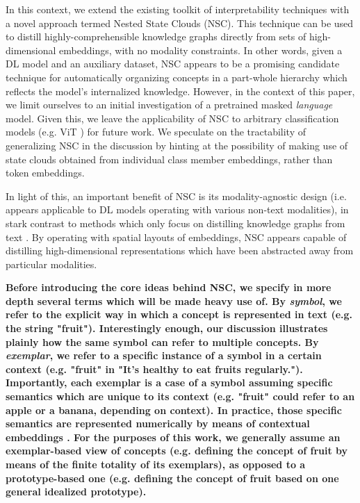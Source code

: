 In this context, we extend the existing toolkit of interpretability techniques with a novel approach termed Nested State Clouds (NSC). This technique can be used to distill highly-comprehensible knowledge graphs directly from sets of high-dimensional embeddings, with no modality constraints. In other words, given a DL model and an auxiliary dataset, NSC appears to be a promising candidate technique for automatically organizing concepts in a part-whole hierarchy which reflects the model's internalized knowledge. However, in the context of this paper, we limit ourselves to an initial investigation of a pretrained masked \textit{language} model. Given this, we leave the applicability of NSC to arbitrary classification models (e.g. ViT \citep{dosovitskiy_image_2021}) for future work. We speculate on the tractability of generalizing NSC in the discussion by hinting at the possibility of making use of state clouds obtained from individual class member embeddings, rather than token embeddings.

In light of this, an important benefit of NSC is its modality-agnostic design (i.e. appears applicable to DL models operating with various non-text modalities), in stark contrast to methods which only focus on distilling knowledge graphs from text \citep{wang_language_2020}. By operating with spatial layouts of embeddings, NSC appears capable of distilling high-dimensional representations which have been abstracted away from particular modalities.

\textbf{Before introducing the core ideas behind NSC, we specify in more depth several terms which will be made heavy use of. By \textit{symbol}, we refer to the explicit way in which a concept is represented in text (e.g. the string "fruit"). Interestingly enough, our discussion illustrates plainly how the same symbol can refer to multiple concepts. By \textit{exemplar}, we refer to a specific instance of a symbol in a certain context (e.g. "fruit" in "It's healthy to eat \textbf{fruit}s regularly."). Importantly, each exemplar is a case of a symbol assuming specific semantics which are unique to its context (e.g. "fruit" could refer to an apple or a banana, depending on context). In practice, those specific semantics are represented numerically by means of contextual embeddings \citep{devlin_bert_nodate}. For the purposes of this work, we generally assume an exemplar-based view of concepts (e.g. defining the concept of fruit by means of the finite totality of its exemplars), as opposed to a prototype-based one (e.g. defining the concept of fruit based on one general idealized prototype).}

